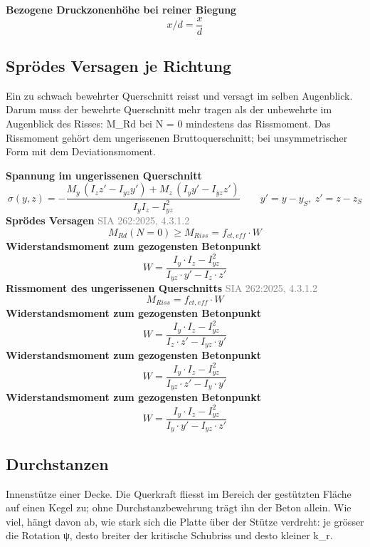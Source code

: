 \documentclass[11pt,a4paper]{article}
\newcommand{\normref}[1]{{\small\textcolor{gray}{#1}}}
\begin{document}
\noindent\textbf{Bezogene Druckzonenhöhe bei reiner Biegung}
\begin{equation*}
x/d = \frac{x}{d}
\end{equation*}
\subsection{Sprödes Versagen je Richtung}
Ein zu schwach bewehrter Querschnitt reisst und versagt im selben Augenblick. Darum muss der bewehrte Querschnitt mehr tragen als der unbewehrte im Augenblick des Risses: M\_Rd bei N = 0 mindestens das Rissmoment. Das Rissmoment gehört dem ungerissenen Bruttoquerschnitt; bei unsymmetrischer Form mit dem Deviationsmoment.

\noindent\textbf{Spannung im ungerissenen Querschnitt}
\begin{equation*}
\sigma(y, z) = -\frac{M_y\,(I_z z' - I_{yz} y') + M_z\,(I_y y' - I_{yz} z')}{I_y I_z - I_{yz}^2}\qquad y' = y - y_S,\ z' = z - z_S
\end{equation*}
\noindent\textbf{Sprödes Versagen} \hfill \normref{SIA 262:2025, 4.3.1.2}
\begin{equation*}
M_{Rd}(N = 0) \ge M_{Riss} = f_{ct,eff} \cdot W
\end{equation*}
\noindent\textbf{Widerstandsmoment zum gezogensten Betonpunkt}
\begin{equation*}
W = \frac{I_y \cdot I_z - I_{yz}^{2}}{I_{yz} \cdot y' - I_z \cdot z'}
\end{equation*}
\noindent\textbf{Rissmoment des ungerissenen Querschnitts} \hfill \normref{SIA 262:2025, 4.3.1.2}
\begin{equation*}
M_{Riss} = f_{ct,eff} \cdot W
\end{equation*}
\noindent\textbf{Widerstandsmoment zum gezogensten Betonpunkt}
\begin{equation*}
W = \frac{I_y \cdot I_z - I_{yz}^{2}}{I_z \cdot z' - I_{yz} \cdot y'}
\end{equation*}
\noindent\textbf{Widerstandsmoment zum gezogensten Betonpunkt}
\begin{equation*}
W = \frac{I_y \cdot I_z - I_{yz}^{2}}{I_{yz} \cdot z' - I_y \cdot y'}
\end{equation*}
\noindent\textbf{Widerstandsmoment zum gezogensten Betonpunkt}
\begin{equation*}
W = \frac{I_y \cdot I_z - I_{yz}^{2}}{I_y \cdot y' - I_{yz} \cdot z'}
\end{equation*}
\subsection{Durchstanzen}
Innenstütze einer Decke. Die Querkraft fliesst im Bereich der gestützten Fläche auf einen Kegel zu; ohne Durchstanzbewehrung trägt ihn der Beton allein. Wie viel, hängt davon ab, wie stark sich die Platte über der Stütze verdreht: je grösser die Rotation ψ, desto breiter der kritische Schubriss und desto kleiner k\_r.
\end{document}
